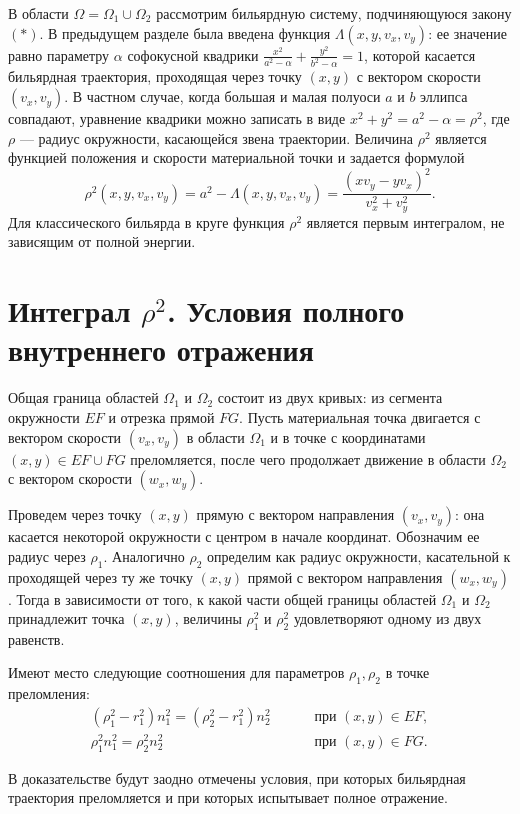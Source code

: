 В области $\Omega = \Omega_1 \cup \Omega_2$ рассмотрим бильярдную систему, подчиняющуюся закону $(\ast)$.
В предыдущем разделе была введена функция $\Lambda(x,y,v_x, v_y)$: ее значение равно параметру $\alpha$ софокусной квадрики $\frac{x^2}{a^2-\alpha} + \frac{y^2}{b^2-\alpha} = 1$, которой касается бильярдная траектория, проходящая через точку $(x,y)$ с вектором скорости $(v_x, v_y)$.
В частном случае, когда большая и малая полуоси $a$ и $b$ эллипса  совпадают, уравнение квадрики можно записать в виде $x^2 + y^2 = a^2-\alpha = \rho^2$, где $\rho$ --- радиус окружности, касающейся звена траектории.
Величина $\rho^2$ является функцией положения и скорости материальной точки и задается формулой $$\rho^2(x,y,v_x,v_y) = a^2 - \Lambda(x, y, v_x, v_y) = \frac{(x v_y - y v_x)^2}{v_x^2 + v_y^2}.$$
Для классического бильярда в круге  функция $\rho^2$ является первым интегралом, не зависящим от полной энергии.

\section{Интеграл $\rho^2$. Условия полного внутреннего отражения}\label{sec:ch5/sec2}
Общая граница областей $\Omega_1$ и $\Omega_2$ состоит из двух кривых: из сегмента окружности $EF$ и отрезка прямой $FG$. 
Пусть материальная точка двигается с вектором скорости $(v_x, v_y)$ в области $\Omega_1$ и в точке с координатами $(x,y) \in EF \cup FG$ преломляется, после чего продолжает движение в области $\Omega_2$ с вектором скорости $(w_x, w_y)$. 

Проведем через точку $(x,y)$ прямую с вектором направления $(v_x, v_y)$: она касается некоторой окружности с центром в начале координат. Обозначим ее радиус через $\rho_1$. Аналогично $\rho_2$ определим как радиус окружности, касательной к проходящей через ту же точку $(x,y)$ прямой с вектором направления $(w_x, w_y)$.
Тогда в зависимости от того, к какой части общей границы областей $\Omega_1$ и $\Omega_2$  принадлежит точка $(x,y)$, величины $\rho_1^2$ и $\rho_2^2$ удовлетворяют одному из двух равенств. 
\begin{statement}
Имеют место следующие соотношения для параметров $\rho_1, \rho_2$ в точке преломления:
\begin{align}
(\rho_1^2 - r_1^2)n_1^2 = (\rho_2^2 - r_1^2)n_2^2 \qquad & 
			\text{ при } (x,y) \in EF, 
			\label{eq:st1_eq1}
			\\
\rho_1^2 n_1^2 = \rho_2^2 n_2^2 \qquad  & \text{ при } (x,y) \in FG.
			\label{eq:st1_eq2}
\end{align}
\label{st:across_EF}
\end{statement}
\begin{remark}
В доказательстве будут заодно отмечены условия, при которых бильярдная траектория преломляется и при которых испытывает полное  отражение.
\end{remark}

